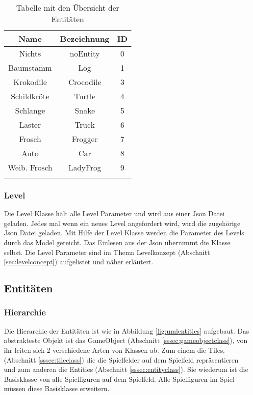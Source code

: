 \documentclass[a4paper,10pt]{report}
\begin{document}
{{{				\begin{longtable}{|c|c|c|}
				\hline
				\textbf{Name}	& \textbf{Bezeichnung}	& \textbf{ID} \\
				\hline				
				Nichts 			& noEntity 				& 0 \\
				\hline
				Baumstamm 		& Log 					& 1 \\
				\hline
				Krokodile 		& Crocodile 			& 3 \\
				\hline
				Schildkröte		& Turtle 				& 4 \\
				\hline		
				Schlange		& Snake 				& 5 \\
				\hline	
				Laster			& Truck 				& 6 \\
				\hline	
				Frosch			& Frogger 				& 7 \\
				\hline
				Auto			& Car 					& 8 \\
				\hline	
				Weib. Frosch	& LadyFrog 				& 9 \\
				\hline			
				\caption{Tabelle mit den Übersicht der Entitäten}
				\end{longtable}
			}		
			\subsubsection{Level}
			{
				\label{sssec:levelclass}
				
				Die Level Klasse hält alle Level Parameter und wird aus einer Json Datei geladen. Jedes mal wenn ein neues Level angefordert wird,
				wird die zugehörige Json Datei geladen. Mit Hilfe der Level Klasse werden die Parameter des Levels durch das Model gereicht. 
				Das Einlesen aus der Json übernimmt die Klasse selbst. Die Level Parameter sind im Thema Levelkonzept (Abschnitt \ref{sec:levelconcept}) aufgelistet und näher erläutert. 
			}		
		}		
		
		\subsection{Entitäten}
		{
			\label{ssec:entities}
			
			\subsubsection{Hierarchie}
			{
				\label{ssec:hierachy}
				
				Die Hierarchie der Entitäten ist wie in Abbildung \ref{fig:umlentities} aufgebaut.
				Das abstrakteste Objekt ist das GameObject (Abschnitt \ref{sssec:gameobjectclass}), von ihr leiten sich 2 verschiedene Arten von Klassen ab.
				Zum einem die Tiles, (Abschnitt \ref{sssec:tileclass}) die die Spielfelder auf dem Spielfeld repräsentieren und zum anderen die Entities (Abschnitt \ref{sssec:entityclass}).
				Sie wiederum ist die Basisklasse von alle Spielfiguren auf dem Spielfeld. Alle Spielfiguren im Spiel müssen diese Basisklasse erweitern.				
				
}}}
\end{document}
